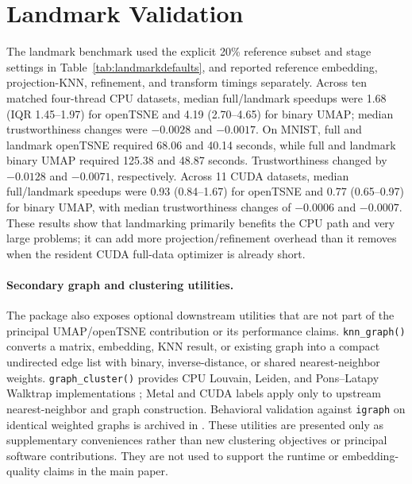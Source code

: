 \documentclass[twoside,11pt]{article}
\begin{document}
\section{Landmark Validation}

The landmark benchmark used the explicit 20\% reference subset and stage settings in Table~\ref{tab:landmarkdefaults}, and reported reference embedding, projection-KNN, refinement, and transform timings separately. Across ten matched four-thread CPU datasets, median full/landmark speedups were 1.68 (IQR 1.45--1.97) for openTSNE and 4.19 (2.70--4.65) for binary UMAP; median trustworthiness changes were $-0.0028$ and $-0.0017$. On MNIST, full and landmark openTSNE required 68.06 and 40.14 seconds, while full and landmark binary UMAP required 125.38 and 48.87 seconds. Trustworthiness changed by $-0.0128$ and $-0.0071$, respectively. Across 11 CUDA datasets, median full/landmark speedups were 0.93 (0.84--1.67) for openTSNE and 0.77 (0.65--0.97) for binary UMAP, with median trustworthiness changes of $-0.0006$ and $-0.0007$. These results show that landmarking primarily benefits the CPU path and very large problems; it can add more projection/refinement overhead than it removes when the resident CUDA full-data optimizer is already short.

\paragraph{Secondary graph and clustering utilities.}

The package also exposes optional downstream utilities that are not part of
the principal UMAP/openTSNE contribution or its performance claims.
\texttt{knn\_graph()} converts a matrix, embedding, KNN result, or existing
graph into a compact undirected edge list with binary, inverse-distance, or
shared nearest-neighbor weights. \texttt{graph\_cluster()} provides CPU
Louvain, Leiden, and Pons--Latapy Walktrap implementations
\citep{blondel2008,traag2019,pons2006}; Metal and CUDA labels apply only to
upstream nearest-neighbor and graph construction. Behavioral validation against
\texttt{igraph} on identical weighted graphs is archived in
. These utilities are
presented only as supplementary conveniences rather than new clustering
objectives or principal software contributions. They are not used to support
the runtime or embedding-quality claims in the main paper.

\clearpage

\end{document}
